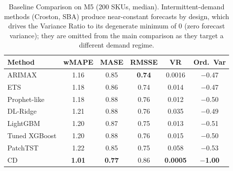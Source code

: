 \documentclass[10pt]{article} %
\theoremstyle{plain}
\theoremstyle{definition}
\begin{document}
\begin{table}[t]
\centering
\footnotesize
\setlength{\tabcolsep}{4pt}
\caption{Baseline Comparison on M5 (200 SKUs, median). Intermittent-demand methods (Croston, SBA) produce near-constant forecasts by design, which drives the Variance Ratio to its degenerate minimum of $0$ (zero forecast variance); they are omitted from the main comparison as they target a different demand regime.}
\label{tab:structural_baselines}
\begin{tabular}{@{}lccccc@{}}
\toprule
Method & wMAPE & MASE & RMSSE & VR & Ord.~Var \\
\midrule
ARIMAX & 1.16 & 0.85 & \textbf{0.74} & 0.0016 & $-$0.47 \\
ETS & 1.18 & 0.86 & 0.74 & 0.014 & $-$0.47 \\
Prophet-like & 1.18 & 0.88 & 0.76 & 0.012 & $-$0.50 \\
DL-Ridge & 1.21 & 0.88 & 0.76 & 0.035 & $-$0.49 \\
LightGBM & 1.20 & 0.87 & 0.75 & 0.013 & $-$0.51 \\
Tuned XGBoost & 1.20 & 0.88 & 0.76 & 0.015 & $-$0.50 \\
PatchTST & 1.22 & 0.85 & 0.75 & 0.058 & $-$0.53 \\
\midrule
CD & \textbf{1.01} & \textbf{0.77} & 0.86 & \textbf{0.0005} & \textbf{$-$1.00} \\
\bottomrule
\end{tabular}
\end{table}
\end{document}
